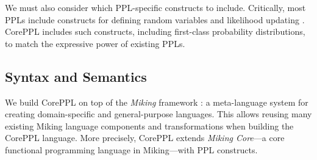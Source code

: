 \documentclass[runningheads]{llncs}
\begin{document}
We must also consider which PPL-specific constructs to include.
Critically, most PPLs include constructs for defining random variables and likelihood updating \cite{gordon2014probabilistic}.
CorePPL includes such constructs, including first-class probability distributions, to match the expressive power of existing PPLs.

\subsection{Syntax and Semantics}\label{sec:cpplsyn}
We build CorePPL on top of the \emph{Miking} framework \cite{broman2019vision}: a meta-language system for creating domain-specific and general-purpose languages.
This allows reusing many existing Miking language components and transformations when building the CorePPL language.
More precisely, CorePPL extends \emph{Miking Core}---a core functional programming language in Miking---with PPL constructs.
\end{document}
